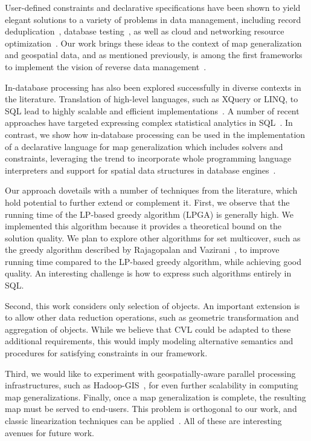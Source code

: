 \documentclass[11pt, oneside]{report}
\begin{document}
{User-defined constraints and declarative specifications have been shown to yield elegant solutions to a variety of problems in data management, including record deduplication~\cite{arasu2009dedupalog}, database testing~\cite{binnig2007reverseqp,binnig2007symbolicqp}, as well as cloud and networking resource optimization~\cite{liu2012cologne}. Our work brings these ideas to the context of map generalization and geospatial data, and as mentioned previously, is among the first frameworks to implement the vision of reverse data management~\cite{meliou2011reverse}. 

In-database processing has also been explored successfully in diverse contexts in the literature. Translation of high-level languages, such as XQuery or LINQ, to SQL lead to highly scalable and efficient implementations~\cite{boncz2005pathfinder,grust2009ferry}. A number of recent approaches have targeted expressing complex statistical analytics in SQL~\cite{hellerstein2012madlib,ordonez2007statisticsudfs}. In contrast, we show how in-database processing can be used in the implementation of a declarative language for map generalization which includes solvers and constraints, leveraging the trend to incorporate whole programming language interpreters and support for spatial data structures in database engines~\cite{blakeley2008dotnet}.  

Our approach dovetails with a number of techniques from the literature, which hold potential to further extend or complement it. First, we observe that the running time of the LP-based greedy algorithm (LPGA) is generally high. We implemented this algorithm because it provides a theoretical bound on the solution quality. We plan to explore other algorithms for set multicover, such as the greedy algorithm described by Rajagopalan and Vazirani~\cite{rajagopalan1998primal}, to improve running time compared to the LP-based greedy algorithm, while achieving good quality. An interesting challenge is how to express such algorithms entirely in SQL.

Second, this work considers only selection of objects. An important extension is to allow other data reduction operations, such as geometric transformation and aggregation of objects. While we believe that CVL could be adapted to these additional requirements, this would imply modeling alternative semantics and procedures for satisfying constraints in our framework.

Third, we would like to experiment with geospatially-aware parallel processing infrastructures, such as Hadoop-GIS~\cite{aji2013hadoopgis}, for even further scalability in computing map generalizations. Finally, once a map generalization is complete, the resulting map must be served to end-users. This problem is orthogonal to our work, and classic linearization techniques can be applied~\cite{hilbert1891ueber}. All of these are interesting avenues for future work.


}
\end{document}
